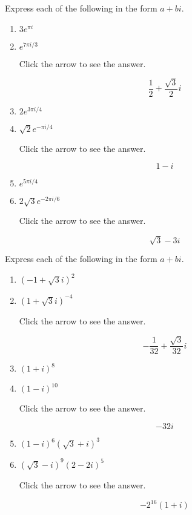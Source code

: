 \documentclass{ximera}
\begin{document}
\begin{problem}\label{prb:A.19}
Express each of the following in the form $a + bi$.

\begin{enumerate}
\item $3e^{\pi i}$
\item $e^{7\pi i/3}$

Click the arrow to see the answer.
\begin{expandable}{}{}
 $$\frac{1}{2} + \frac{\sqrt{3}}{2} i$$
\end{expandable}

\item $2e^{3 \pi i/4}$
\item $\sqrt{2}e^{-\pi i/4}$

Click the arrow to see the answer.
\begin{expandable}{}{}
 $$1 - i$$
\end{expandable}

\item $e^{5\pi i/4}$
\item $2\sqrt{3}e^{-2\pi i/6}$

Click the arrow to see the answer.
\begin{expandable}{}{}
 $$\sqrt{3} - 3i$$
\end{expandable}
\end{enumerate}
\end{problem}

\begin{problem}\label{prb:A.20}
Express each of the following in the form $a + bi$.

\begin{enumerate}
\item $(-1 + \sqrt{3}i)^2$
\item $(1 + \sqrt{3}i)^{-4}$

Click the arrow to see the answer.
\begin{expandable}{}{}
 $$-\frac{1}{32} + \frac{\sqrt{3}}{32}i$$
\end{expandable}

\item $(1 + i)^8$
\item $(1 - i)^{10}$

Click the arrow to see the answer.
\begin{expandable}{}{}
 $$-32i$$
\end{expandable}

\item $(1 - i)^{6}(\sqrt{3} + i)^{3}$
\item $(\sqrt{3} - i)^{9}(2 - 2i)^{5}$

Click the arrow to see the answer.
\begin{expandable}{}{}
 $$-2^{16}(1 + i)$$
\end{expandable}
\end{enumerate}
\end{problem}
\end{document}
